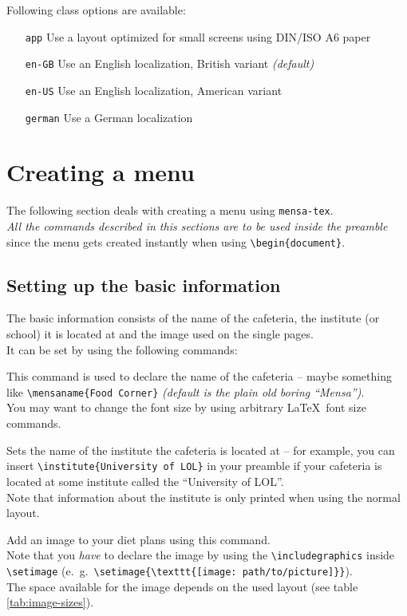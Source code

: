 \documentclass[11pt]{ltxdoc}
\begin{document}
	\bigskip
	Following class options are available:
	\begin{itemize}
		\item[\texttt{app}] Use a layout optimized for small screens using DIN/ISO A6 paper
		\item[\texttt{en-GB}] Use an English localization, British variant \textit{(default)}
		\item[\texttt{en-US}] Use an English localization, American variant
		\item[\texttt{german}] Use a German localization
	\end{itemize}



	\section{Creating a menu}
	The following section deals with creating a menu using \texttt{mensa-tex}. \\
	\textit{\color{red} All the commands described in this sections are to be used inside the preamble} since the menu gets created instantly when using \verb|\begin{document}|.
	
	\subsection{Setting up the basic information}
	The basic information consists of the name of the cafeteria, the institute (or school) it is located at and the image used on the single pages. \\
	It can be set by using the following commands:
	
	\medskip
	\DescribeMacro{\mensaname}
	This command is used to declare the name of the cafeteria -- maybe something like \verb|\mensaname{Food Corner}| \textit{(default is the plain old boring \enquote{Mensa})}. \\
	You may want to change the font size by using arbitrary \LaTeX\ font size commands.
	
	\medskip
	\DescribeMacro{\institute}
	Sets the name of the institute the cafeteria is located at -- for example, you can insert \verb|\institute{University of LOL}| in your preamble if your cafeteria is located at some institute called the \enquote{University of LOL}. \\
	Note that information about the institute is only printed when using the normal layout.

	\medskip
	\DescribeMacro{\setimage}
	Add an image to your diet plans using this command. \\
	Note that you \textit{have} to declare the image by using the \verb|\includegraphics| inside \verb|\setimage| (e.~g.~\verb|\setimage{\texttt{[image: path/to/picture]}}|). \\
	The space available for the image depends on the used layout (see table \ref{tab:image-sizes}).
	
\end{document}
